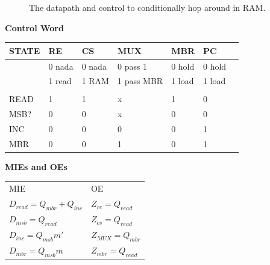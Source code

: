 \begin{enumerate}
\begin{solution} {

\begin{figure}[ht]
\caption{The datapath and control to conditionally hop around
in RAM.}
\end{figure}


{\bf Control Word}

\begin{tabular}{l|l|l|l|l|l|l}
STATE & RE     & CS     &MUX          &MBR    & PC	\\ \hline
      & 0 nada & 0 nada &0 pass 1     &0 hold &0 hold	\\ \hline
      & 1 read & 1 RAM  &1 pass MBR   &1 load &1 load	\\ \hline
      &        &        &             &       &       	\\ \hline
READ  & 1      & 1      & x           & 1     & 0	\\ \hline
MSB?  & 0      & 0      & x           & 0     & 0	\\ \hline
INC   & 0      & 0      & 0           & 0     & 1	\\ \hline
MBR   & 0      & 0      & 1           & 0     & 1	\\ \hline
\end{tabular}

{\bf MIEs and OEs}

\begin{tabular}{ll}
MIE					&	OE			\\
$D_{read}= Q_{mbr}+Q_{inc}$		&  $Z_{re} = Q_{read}$		\\
$D_{msb} = Q_{read}$			&  $Z_{cs} = Q_{read}$		\\
$D_{inc}= Q_{msb} m'$			&  $Z_{MUX} = Q_{mbr}$		\\
$D_{mbr}= Q_{msb} m$			&  $Z_{mbr} = Q_{read}$		\\
\end{tabular}

}
\end{solution}
\end{enumerate}
